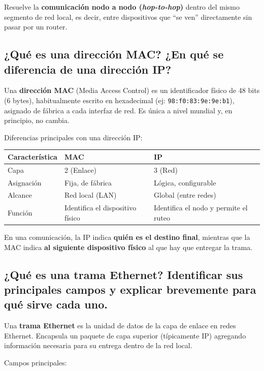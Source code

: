 \documentclass[12pt,a4paper]{article}
\begin{document}
Resuelve la \textbf{comunicación nodo a nodo (\textit{hop-to-hop})} dentro del mismo segmento de red local, es decir, entre dispositivos que ``se ven'' directamente sin pasar por un router.


\subsection{¿Qué es una dirección MAC? ¿En qué se diferencia de una dirección IP?}

Una \textbf{dirección MAC} (Media Access Control) es un identificador físico de 48 bits (6 bytes), habitualmente escrito en hexadecimal (ej: \texttt{98:f0:83:9e:9e:b1}), asignado de fábrica a cada interfaz de red. Es única a nivel mundial y, en principio, no cambia.

Diferencias principales con una dirección IP:

\begin{center}
\begin{tabular}{|l|l|l|}
\hline
\textbf{Característica} & \textbf{MAC} & \textbf{IP} \\
\hline
Capa & 2 (Enlace) & 3 (Red) \\
\hline
Asignación & Fija, de fábrica & Lógica, configurable \\
\hline
Alcance & Red local (LAN) & Global (entre redes) \\
\hline
Función & Identifica el dispositivo físico & Identifica el nodo y permite el ruteo \\
\hline
\end{tabular}
\end{center}

En una comunicación, la IP indica \textbf{quién es el destino final}, mientras que la MAC indica \textbf{al siguiente dispositivo físico} al que hay que entregar la trama.


\subsection{¿Qué es una trama Ethernet? Identificar sus principales campos y explicar brevemente para qué sirve cada uno.}

Una \textbf{trama Ethernet} es la unidad de datos de la capa de enlace en redes Ethernet. Encapsula un paquete de capa superior (típicamente IP) agregando información necesaria para su entrega dentro de la red local.

Campos principales:
\end{document}
